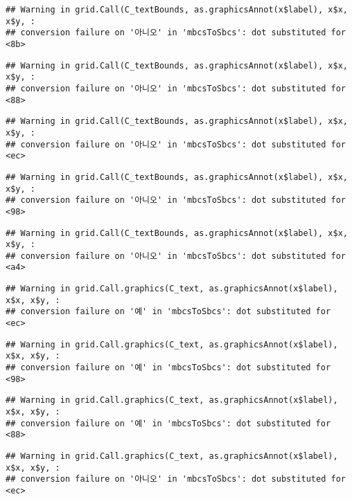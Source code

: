 \documentclass[
]{article}
\begin{document}
\begin{verbatim}
## Warning in grid.Call(C_textBounds, as.graphicsAnnot(x$label), x$x, x$y, :
## conversion failure on '아니오' in 'mbcsToSbcs': dot substituted for <8b>
\end{verbatim}

\begin{verbatim}
## Warning in grid.Call(C_textBounds, as.graphicsAnnot(x$label), x$x, x$y, :
## conversion failure on '아니오' in 'mbcsToSbcs': dot substituted for <88>
\end{verbatim}

\begin{verbatim}
## Warning in grid.Call(C_textBounds, as.graphicsAnnot(x$label), x$x, x$y, :
## conversion failure on '아니오' in 'mbcsToSbcs': dot substituted for <ec>
\end{verbatim}

\begin{verbatim}
## Warning in grid.Call(C_textBounds, as.graphicsAnnot(x$label), x$x, x$y, :
## conversion failure on '아니오' in 'mbcsToSbcs': dot substituted for <98>
\end{verbatim}

\begin{verbatim}
## Warning in grid.Call(C_textBounds, as.graphicsAnnot(x$label), x$x, x$y, :
## conversion failure on '아니오' in 'mbcsToSbcs': dot substituted for <a4>
\end{verbatim}

\begin{verbatim}
## Warning in grid.Call.graphics(C_text, as.graphicsAnnot(x$label), x$x, x$y, :
## conversion failure on '예' in 'mbcsToSbcs': dot substituted for <ec>
\end{verbatim}

\begin{verbatim}
## Warning in grid.Call.graphics(C_text, as.graphicsAnnot(x$label), x$x, x$y, :
## conversion failure on '예' in 'mbcsToSbcs': dot substituted for <98>
\end{verbatim}

\begin{verbatim}
## Warning in grid.Call.graphics(C_text, as.graphicsAnnot(x$label), x$x, x$y, :
## conversion failure on '예' in 'mbcsToSbcs': dot substituted for <88>
\end{verbatim}

\begin{verbatim}
## Warning in grid.Call.graphics(C_text, as.graphicsAnnot(x$label), x$x, x$y, :
## conversion failure on '아니오' in 'mbcsToSbcs': dot substituted for <ec>
\end{verbatim}
\end{document}

